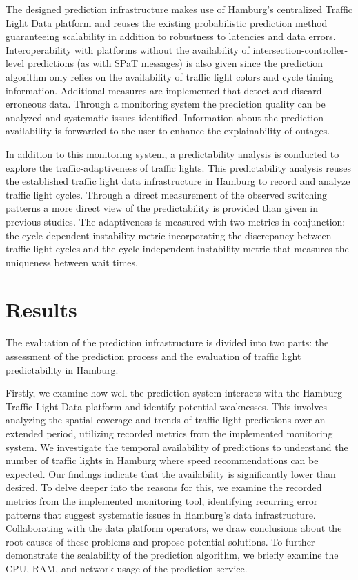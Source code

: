 \begin{Summary}
The designed prediction infrastructure makes use of Hamburg's centralized Traffic Light Data platform and reuses the existing probabilistic prediction method  \cite{pape_untersuchung_2012, protschky_extensive_2014, protschky_adaptive_2014} guaranteeing scalability in addition to robustness to latencies and data errors. Interoperability with platforms without the availability of intersection-controller-level predictions (as with SPaT messages) is also given since the prediction algorithm only relies on the availability of traffic light colors and cycle timing information. Additional measures are implemented that detect and discard erroneous data. Through a monitoring system the prediction quality can be analyzed and systematic issues identified. Information about the prediction availability is forwarded to the user to enhance the explainability of outages. 

In addition to this monitoring system, a predictability analysis is conducted to explore the traffic-adaptiveness of traffic lights. This predictability analysis reuses the established traffic light data infrastructure in Hamburg to record and analyze traffic light cycles. Through a direct measurement of the observed switching patterns a more direct view of the predictability is provided than given in previous studies. The adaptiveness is measured with two metrics in conjunction: the cycle-dependent instability metric incorporating the discrepancy between traffic light cycles and the cycle-independent instability metric that measures the uniqueness between wait times.
\end{Summary}

\section{Results}

The evaluation of the prediction infrastructure is divided into two parts: the assessment of the prediction process and the evaluation of traffic light predictability in Hamburg.

Firstly, we examine how well the prediction system interacts with the Hamburg Traffic Light Data platform and identify potential weaknesses. This involves analyzing the spatial coverage and trends of traffic light predictions over an extended period, utilizing recorded metrics from the implemented monitoring system. We investigate the temporal availability of predictions to understand the number of traffic lights in Hamburg where speed recommendations can be expected. Our findings indicate that the availability is significantly lower than desired. To delve deeper into the reasons for this, we examine the recorded metrics from the implemented monitoring tool, identifying recurring error patterns that suggest systematic issues in Hamburg's data infrastructure. Collaborating with the data platform operators, we draw conclusions about the root causes of these problems and propose potential solutions. To further demonstrate the scalability of the prediction algorithm, we briefly examine the CPU, RAM, and network usage of the prediction service.

